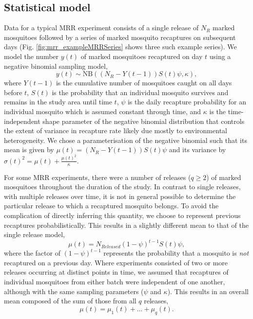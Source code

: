 \documentclass[12pt]{article}
\begin{document}
\subsection{Statistical model}\label{sec:mrr_statistical}
Data for a typical MRR experiment consists of a single release of $N_{R}$ marked mosquitoes followed by a series of marked mosquito recaptures on subsequent days (Fig. \ref{fig:mrr_exampleMRRSeries} shows three such example series). We model the number $y(t)$ of marked mosquitoes recaptured on day $t$ using a negative binomial sampling model,
%
\begin{equation}\label{eq:NB}
y(t) \sim \text{NB}\left((N_{R} - Y(t-1)) S(t) \psi, \kappa\right),
\end{equation}
%
where $Y(t-1)$ is the cumulative number of mosquitoes caught on all days before $t$, $S(t)$ is the probability that an individual mosquito survives and remains in the study area until time $t$, $\psi$ is the daily recapture probability for an individual mosquito which is assumed constant through time, and $\kappa$ is the time-independent shape parameter of the negative binomial distribution that controls the extent of variance in recapture rate likely due mostly to environmental heterogeneity. We chose a parameterisation of the negative binomial such that its mean is given by $\mu(t) = (N_{R} - Y(t-1)) S(t) \psi$ and its variance by $\sigma(t)^2 = \mu(t) + \frac{\mu(t)^2}{\kappa}$. 

For some MRR experiments, there were a number of releases ($q\geq 2$) of marked mosquitoes throughout the duration of the study. In contrast to single releases, with multiple releases over time, it is not in general possible to determine the particular release to which a recaptured mosquito belongs. To avoid the complication of directly inferring this quantity, we choose to represent previous recaptures probabilistically. This results in a slightly different mean to that of the single release model,
%
\begin{equation}
\mu(t) = N_{Released}(1-\psi)^{t-1} S(t) \psi,
\end{equation}
%
where the factor of $(1-\psi)^{t-1}$ represents the probability that a mosquito is \textit{not} recaptured on a previous day. Where experiments consisted of two or more releases occurring at distinct points in time, we assumed that recaptures of individual mosquitoes from either batch were independent of one another, although with the same sampling parameters ($\psi$ and $\kappa$). This results in an overall mean composed of the sum of those from all $q$ releases,
%
\begin{equation}
\mu(t) = \mu_1(t) + ... + \mu_q(t).
\end{equation}
%
\end{document}
